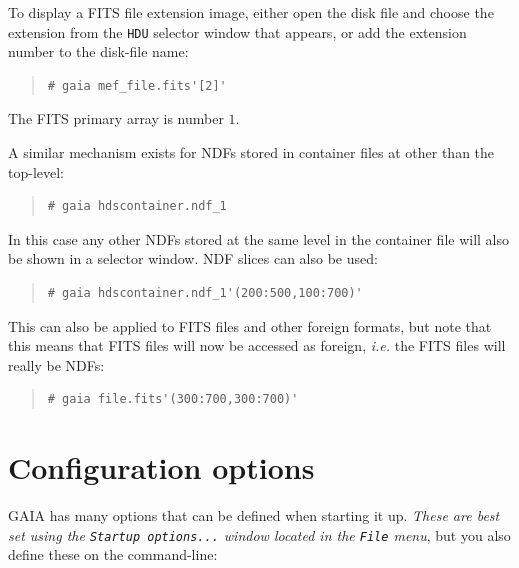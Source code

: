 \documentclass[twoside,11pt]{article}
\newcommand{\xlabel}[1]{}
\renewcommand{\_}{\texttt{\symbol{95}}}
\newcommand{\mytt}[1]{{\texttt{#1}}}
\begin{document}
To display a FITS file extension image, either open the disk file and
choose the extension from the \mytt{HDU} selector window that appears,
or add the extension number to the disk-file name:
\begin{quote}
\begin{verbatim}
# gaia mef_file.fits'[2]'
\end{verbatim}
\end{quote}
The FITS primary array is number $1$.

A similar mechanism exists for NDFs stored in container files at other
than the top-level:
\begin{quote}
\begin{verbatim}
# gaia hdscontainer.ndf_1
\end{verbatim}
\end{quote}
In this case any other NDFs stored at the same level in the container
file will also be shown in a selector window. NDF slices can also be
used:
\begin{quote}
\begin{verbatim}
# gaia hdscontainer.ndf_1'(200:500,100:700)'
\end{verbatim}
\end{quote}
This can also be applied to FITS files and other foreign formats, but
note that this means that FITS files will now be accessed as foreign,
\textit{i.e.} the FITS files will really be NDFs:
\begin{quote}
\begin{verbatim}
# gaia file.fits'(300:700,300:700)'
\end{verbatim}
\end{quote}

\section{\xlabel{configuration_options}\label{configuration_options}Configuration options}

GAIA has many options that can be defined when starting it up. \textit{These
are best set using the \mytt{Startup options...} window located in the
\mytt{File} menu}, but you also define these on the command-line:
\end{document}
